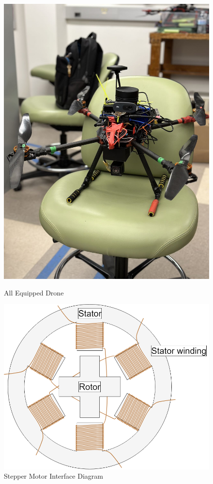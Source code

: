 \documentclass[conference]{IEEEtran}
\begin{document}
\begin{figure}[ht]
    \centering
    \begin{minipage}{0.24\textwidth}
        \centering
        \includegraphics[width=0.8\linewidth]{figures/drone_all.png}
        \caption{All Equipped Drone}
        \label{All Equipped Drone}
    \end{minipage}
    \hfill
    \begin{minipage}{0.24\textwidth}
        \centering
        \includegraphics[width=\linewidth]{figures/stepper_motor.png}
        \caption{Stepper Motor Interface Diagram}
        \label{Stepper Motor}
    \end{minipage}
\end{figure}
\end{document}
